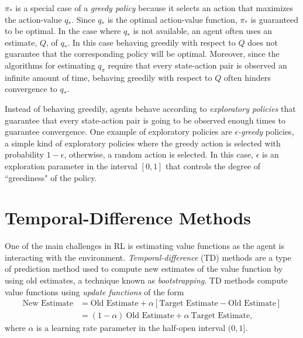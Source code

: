 $\pi_*$ is a special case of a \textit{greedy policy} because it selects an action that maximizes the action-value $q_*$. 
Since $q_*$ is the optimal action-value function, $\pi_*$ is guaranteed to be optimal.
In the case where $q_*$ is not available, an agent often uses an estimate, $Q$, of $q_*$.
In this case behaving greedily with respect to $Q$ does not guarantee that the corresponding policy will be optimal. 
Moreover, since the algorithms for estimating $q_\pi$ require that every state-action pair is observed an infinite amount of time, behaving greedily with respect to $Q$ often hinders convergence to $q_*$.

Instead of behaving greedily, agents behave according to \textit{exploratory policies} that guarantee that every state-action pair is going to be observed enough times to guarantee convergence.
One example of exploratory policies are $\epsilon$\textit{-greedy} policies, a simple kind of exploratory policies where the greedy action is selected with probability $1-\epsilon$, otherwise, a random action is selected. 
In this case, $\epsilon$ is an exploration parameter in the interval $[0,1]$ that controls the degree of ``greediness" of the policy. 


\section{Temporal-Difference Methods}

One of the main challenges in RL is estimating value functions as the agent is interacting with the environment.
\textit{Temporal-difference} (TD) methods are a type of prediction method used to compute new estimates of the value function by using old estimates, a technique known as \textit{bootstrapping}.
TD methods compute value functions using \textit{update functions} of the form
\begin{align}
\label{eq:val_func_update}
\text{New Estimate} & = \text{Old Estimate} 
	+ \alpha [\text{Target Estimate} - \text{Old Estimate}] \nonumber \\
%
& = (1-\alpha) \ \text{Old Estimate} + \alpha \ \text{Target Estimate},
\end{align}
where $\alpha$ is a learning rate parameter in the half-open interval $(0,1]$.

